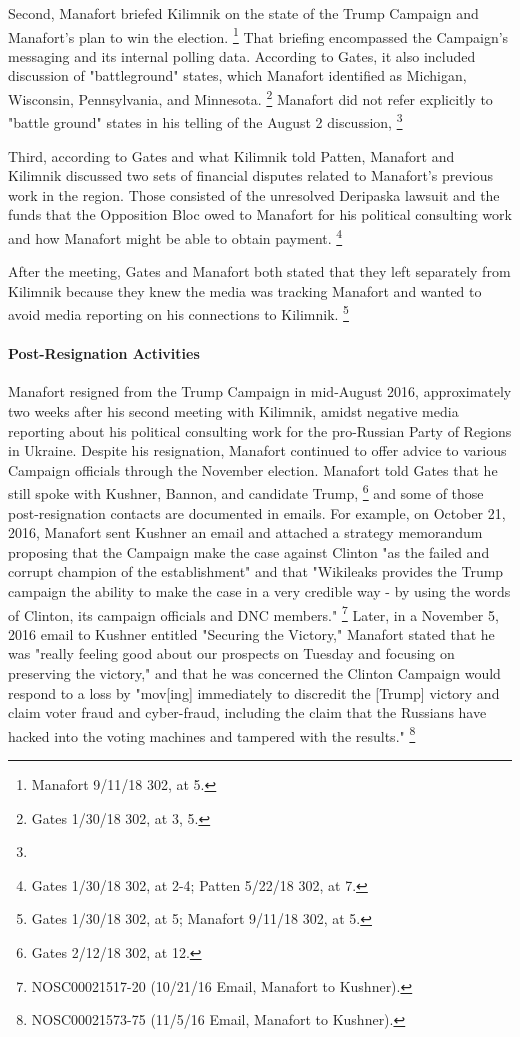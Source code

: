 Second, Manafort briefed Kilimnik on the state of the Trump Campaign and Manafort's plan to win the election.%
\footnote{Manafort 9/11/18 302, at 5.}
That briefing encompassed the Campaign's messaging and its internal polling data.
According to Gates, it also included discussion of "battleground" states, which Manafort identified as Michigan, Wisconsin, Pennsylvania, and Minnesota.%
\footnote{Gates 1/30/18 302, at 3, 5.}
Manafort did not refer explicitly to "battle ground" states in his telling of the August 2 discussion,
\footnote{}

Third, according to Gates and what Kilimnik told Patten, Manafort and Kilimnik discussed two sets of financial disputes related to Manafort's previous work in the region.
Those consisted of the unresolved Deripaska lawsuit and the funds that the Opposition Bloc owed to Manafort for his political consulting work and how Manafort might be able to obtain payment.%
\footnote{Gates 1/30/18 302, at 2-4;
Patten 5/22/18 302, at 7.}

After the meeting, Gates and Manafort both stated that they left separately from Kilimnik because they knew the media was tracking Manafort and wanted to avoid media reporting on his connections to Kilimnik.%
\footnote{Gates 1/30/18 302, at 5;
Manafort 9/11/18 302, at 5.}

\paragraph{Post-Resignation Activities}

Manafort resigned from the Trump Campaign in mid-August 2016, approximately two weeks after his second meeting with Kilimnik, amidst negative media reporting about his political consulting work for the pro-Russian Party of Regions in Ukraine.
Despite his resignation, Manafort continued to offer advice to various Campaign officials through the November election.
Manafort told Gates that he still spoke with Kushner, Bannon, and candidate Trump,%
\footnote{Gates 2/12/18 302, at 12.}
and some of those post-resignation contacts are documented in emails.
For example, on October 21, 2016, Manafort sent Kushner an email and attached a strategy memorandum proposing that the Campaign make the case against Clinton "as the failed and corrupt champion of the establishment" and that "Wikileaks provides the Trump campaign the ability to make the case in a very credible way - by using the words of Clinton, its campaign officials and DNC members."%
\footnote{NOSC00021517-20 (10/21/16 Email, Manafort to Kushner).}
Later, in a November 5, 2016 email to Kushner entitled "Securing the Victory," Manafort stated that he was "really feeling good about our prospects on Tuesday and focusing on preserving the victory," and that he was concerned the Clinton Campaign would respond to a loss by "mov[ing] immediately to discredit the [Trump] victory and claim voter fraud and cyber-fraud, including the claim that the Russians have hacked into the voting machines and tampered with the results."%
\footnote{NOSC00021573-75 (11/5/16 Email, Manafort to Kushner).}

